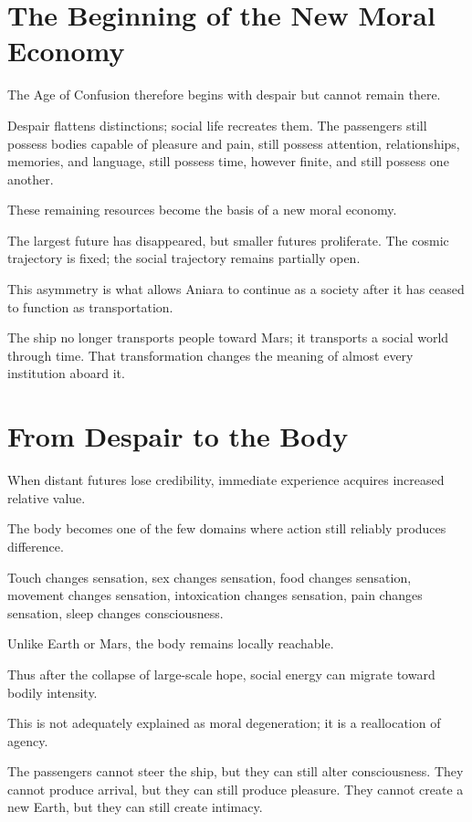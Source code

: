 \documentclass[11pt,oneside]{book}
\theoremstyle{definition}
\theoremstyle{remark}
\begin{document}
\section{The Beginning of the New Moral Economy}

The Age of Confusion therefore begins with despair but cannot remain there.

Despair flattens distinctions; social life recreates them. The passengers still possess bodies capable of pleasure and pain, still possess attention, relationships, memories, and language, still possess time, however finite, and still possess one another.

These remaining resources become the basis of a new moral economy.

The largest future has disappeared, but smaller futures proliferate. The cosmic trajectory is fixed; the social trajectory remains partially open.

This asymmetry is what allows Aniara to continue as a society after it has ceased to function as transportation.

The ship no longer transports people toward Mars; it transports a social world through time. That transformation changes the meaning of almost every institution aboard it.

\section{From Despair to the Body}

When distant futures lose credibility, immediate experience acquires increased relative value.

The body becomes one of the few domains where action still reliably produces difference.

Touch changes sensation, sex changes sensation, food changes sensation, movement changes sensation, intoxication changes sensation, pain changes sensation, sleep changes consciousness.

Unlike Earth or Mars, the body remains locally reachable.

Thus after the collapse of large-scale hope, social energy can migrate toward bodily intensity.

This is not adequately explained as moral degeneration; it is a reallocation of agency.

The passengers cannot steer the ship, but they can still alter consciousness. They cannot produce arrival, but they can still produce pleasure. They cannot create a new Earth, but they can still create intimacy.
\end{document}
